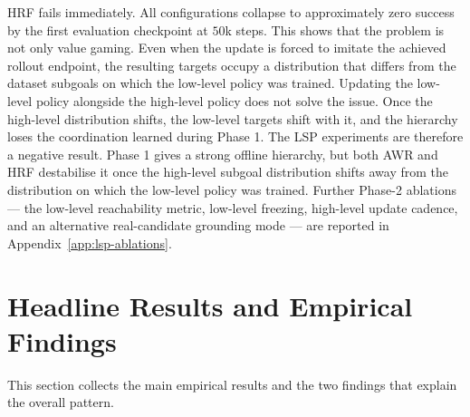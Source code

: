 HRF fails immediately. All configurations collapse to approximately
zero success by the first evaluation checkpoint at $50$k steps. This
shows that the problem is not only value gaming. Even when the update
is forced to imitate the achieved rollout endpoint, the resulting
targets occupy a distribution that differs from the dataset subgoals on
which the low-level policy was trained.
Updating the low-level policy alongside the high-level policy does not
solve the issue. Once the high-level distribution shifts, the low-level
targets shift with it, and the hierarchy loses the coordination learned
during Phase 1.
The LSP experiments are therefore a negative result. Phase 1 gives a
strong offline hierarchy, but both AWR and HRF destabilise it once the
high-level subgoal distribution shifts away from the distribution on
which the low-level policy was trained.
Further Phase-2 ablations --- the low-level reachability metric,
low-level freezing, high-level update cadence, and an alternative
real-candidate grounding mode --- are reported in
Appendix~\ref{app:lsp-ablations}.

\section{Headline Results and Empirical Findings}
\label{sec:exp-headline}

This section collects the main empirical results and the two findings
that explain the overall pattern.


